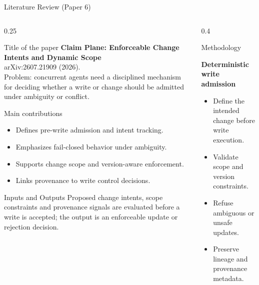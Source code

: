 \begin{frame}{Literature Review (Paper 6)}
\begin{columns}[T]
  \begin{column}{0.25\textwidth}
    \begin{block}{Title of the paper \cite{claimplane26}}
      \tiny \textbf{Claim Plane: Enforceable Change Intents and Dynamic Scope}\\[2pt] arXiv:2607.21909 (2026).\\[2pt] Problem: concurrent agents need a disciplined mechanism for deciding whether a write or change should be admitted under ambiguity or conflict.
    \end{block}
    \vspace{0.12cm}
    \begin{block}{Main contributions}
      \tiny
      \begin{itemize}\setlength\itemsep{1pt}
      \item Defines pre-write admission and intent tracking.
\item Emphasizes fail-closed behavior under ambiguity.
\item Supports change scope and version-aware enforcement.
\item Links provenance to write control decisions.
      \end{itemize}
    \end{block}
    \vspace{0.12cm}
    \begin{block}{Inputs and Outputs}
      \tiny Proposed change intents, scope constraints and provenance signals are evaluated before a write is accepted; the output is an enforceable update or rejection decision.
    \end{block}
  \end{column}

  \begin{column}{0.4\textwidth}
    \begin{block}{Methodology}
    \tiny
    \begin{center}
    \textbf{Deterministic write admission}
    \end{center}
    \begin{itemize}\setlength\itemsep{1pt}
    \item Define the intended change before write execution.
\item Validate scope and version constraints.
\item Refuse ambiguous or unsafe updates.
\item Preserve lineage and provenance metadata.
    \end{itemize}
    \end{block}


\end{column}
\end{columns}
\end{frame}

